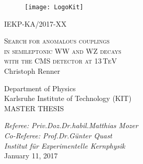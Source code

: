 \begin{titlepage}
  \begin{addmargin}[0cm]{0cm}
    \thispagestyle{empty}
    \vspace{-1cm}
    \begin{center}

	\begin{figure}[htbp]
  		\centering
  		\hspace{26pt}
  		\texttt{[image: LogoKit]}
	\end{figure}

	\hspace{8cm}IEKP-KA/2017-XX\\%

	\vspace{0.8cm}

	\Large{\textsc{Search for anomalous couplings\\in semileptonic WW and WZ decays\\with the CMS detector at 13\,TeV}}\\
	\vspace{0.9cm}
	\Large{Christoph Renner}\\
	\vspace{0.9cm}
	\vspace{1cm}
	\large{Department of Physics\\
  
    Karlsruhe Institute of Technology (KIT)\\
    \vspace{0.825 cm}
    \large{MASTER THESIS}\\
    \vspace{0.825 cm}


    \large{\textit{Referee: Priv.\;Doz.\;Dr.\;habil.\;Matthias Mozer}}\\
	\large{\textit{Co-Referee: Prof.\;Dr.\;G\"unter Quast}}\\
    \vspace{0.2 cm}
	\large{\textit{Institut f\"ur Experimentelle Kernphysik}}\\


	\vspace{1.0cm}
	\large{January 11, 2017}%
	}
	\end{center}
   \end{addmargin}
\end{titlepage}
